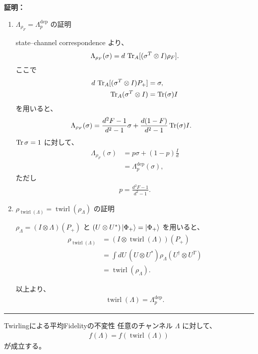 \documentclass[a4paper,10.5pt]{article}
\numberwithin{equation}{section}
\newenvironment{proofbox}
{\begin{prooflabel}\textbf{証明：}\end{prooflabel}\vspace{0.8em}}
{\par\vspace{1em}\hrule\vspace{1em}}
\begin{document}
\begin{proofbox}
\begin{enumerate}
\item $\Lambda_{\rho_F}=\Lambda_p^{\mathrm{dep}}$ の証明

state--channel correspondence より、
\begin{align*}
    \Lambda_{\rho_F}(\sigma)
    =
    d\,\Tr_A[(\sigma^T\otimes I)\rho_F].
\end{align*}
ここで
\begin{align*}
    d\,\Tr_A[(\sigma^T\otimes I)P_+]
    &=
    \sigma,\\
    \Tr_A(\sigma^T\otimes I)
    &=
    \Tr(\sigma)I
\end{align*}
を用いると、
\begin{align*}
    \Lambda_{\rho_F}(\sigma)
    &=
    \frac{d^2F-1}{d^2-1}\sigma
    +
    \frac{d(1-F)}{d^2-1}\Tr(\sigma)I.
\end{align*}
$\Tr\sigma=1$ に対して、
\begin{align*}
    \Lambda_{\rho_F}(\sigma)
    &=
    p\sigma+(1-p)\frac{I}{d}\\
    &=
    \Lambda_p^{\mathrm{dep}}(\sigma),
\end{align*}
ただし
\begin{align*}
    \boxed{
    p=\frac{d^2F-1}{d^2-1}
    }.
\end{align*}

\item
$\rho_{\operatorname{twirl}(\Lambda)}
=\operatorname{twirl}(\rho_\Lambda)$ の証明

$\rho_\Lambda=(I\otimes\Lambda)(P_+)$ と
$(U\otimes U^*)\ket{\Phi_+}=\ket{\Phi_+}$ を用いると、
\begin{align*}
    \rho_{\operatorname{twirl}(\Lambda)}
    &=
    (I\otimes\operatorname{twirl}(\Lambda))(P_+)\\
    &=
    \int dU\,
    (U\otimes U^*)\rho_\Lambda
    (U^\dagger\otimes U^T)\\
    &=
    \operatorname{twirl}(\rho_\Lambda).
\end{align*}

以上より、
\begin{align*}
    \boxed{
    \operatorname{twirl}(\Lambda)
    =
    \Lambda_p^{\mathrm{dep}}
    }.
\end{align*}
\end{enumerate}
\end{proofbox}


\begin{theorembox}{Twirlingによる平均Fidelityの不変性}
任意のチャンネル $\Lambda$ に対して、
\begin{align*}
    \boxed{
    f(\Lambda)
    =
    f(\operatorname{twirl}(\Lambda))
    }
\end{align*}
が成立する。
\end{theorembox}
\end{document}
